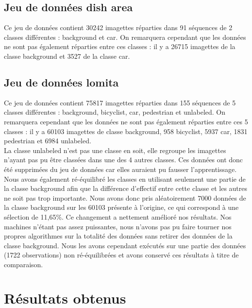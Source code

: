\subsection{Jeu de données dish area}

	Ce jeu de données contient 30242 imagettes réparties dans 91 séquences de 2 classes différentes : background et car. On remarquera cependant que les données ne sont pas également réparties entre ces classes : il y a 26715 imagettes de la classe background et 3527 de la classe car.

\subsection{Jeu de données lomita}

	Ce jeu de données contient 75817 imagettes réparties dans 155 séquences de 5 classes différentes : background, bicyclist, car, pedestrian et unlabeled. On remarquera cependant que les données ne sont pas également réparties entre ces 5 classes : il y a 60103 imagettes de classe background, 958 bicyclist, 5937 car, 1831 pedestrian et 6984 unlabeled. \\

	La classe unlabeled n'est pas une classe en soit, elle regroupe les imagettes n'ayant pas pu être classées dans une des 4 autres classes. Ces données ont donc été supprimées du jeu de données car elles auraient pu fausser l'apprentissage. \\

	Nous avons également ré-équilibré les classes en utilisant seulement une partie de la classe background afin que la différence d'effectif entre cette classe et les autres ne soit pas trop importante. Nous avons donc pris aléatoirement 7000 données de la classe background sur les 60103 présente à l'origine, ce qui correspond à une sélection de 11,65\%. Ce changement a nettement amélioré nos résultats. Nos machines n'étant pas assez puissantes, nous n'avons pas pu faire tourner nos propres algorithmes sur la totalité des données sans retirer des données de la classe background. Nous les avons cependant exécutés sur une partie des données (1722 observations) non ré-équilibrées et avons conservé ces résultats à titre de comparaison. \\


\section{Résultats obtenus}


